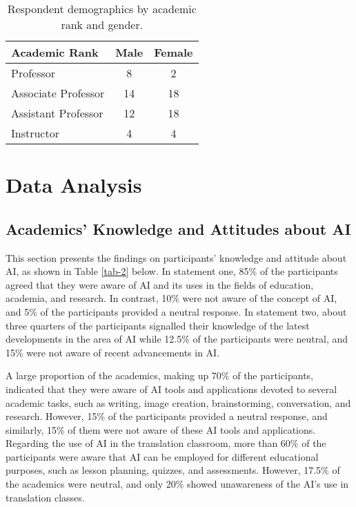 \documentclass[english]{textolivre}
\begin{document}
\begin{table}[ht]
\centering
\begin{threeparttable}
\caption{Respondent demographics by academic rank and gender.}\label{tab-1}
\begin{tabular}{lcc}
\toprule
Academic Rank & Male & Female \\
\midrule
Professor           & 8  & 2  \\
Associate Professor & 14 & 18 \\
Assistant Professor & 12 & 18 \\
Instructor          & 4  & 4  \\
\bottomrule
\end{tabular}
\end{threeparttable}
\end{table}

\section{Data Analysis}

\subsection{Academics’ Knowledge and Attitudes about AI}

This section presents the findings on participants’ knowledge and attitude about AI, as shown in Table \ref{tab-2} below. In statement one, 85\% of the participants agreed that they were aware of AI and its uses in the fields of education, academia, and research. In contrast, 10\% were not aware of the concept of AI, and 5\% of the participants provided a neutral response. In statement two, about three quarters of the participants signalled their knowledge of the latest developments in the area of AI while 12.5\% of the participants were neutral, and 15\% were not aware of recent advancements in AI. 

A large proportion of the academics, making up 70\% of the participants, indicated that they were aware of AI tools and applications devoted to several academic tasks, such as writing, image creation, brainstorming, conversation, and research. However, 15\% of the participants provided a neutral response, and similarly, 15\% of them were not aware of these AI tools and applications. Regarding the use of AI in the translation classroom, more than 60\% of the participants were aware that AI can be employed for different educational purposes, such as lesson planning, quizzes, and assessments. However, 17.5\% of the academics were neutral, and only 20\% showed unawareness of the AI’s use in translation classes.
\end{document}
